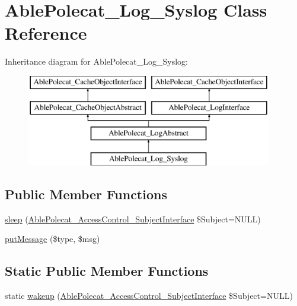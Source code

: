 \hypertarget{class_able_polecat___log___syslog}{}\section{Able\+Polecat\+\_\+\+Log\+\_\+\+Syslog Class Reference}
\label{class_able_polecat___log___syslog}
Inheritance diagram for Able\+Polecat\+\_\+\+Log\+\_\+\+Syslog\+:\begin{figure}[H]
\begin{center}
\leavevmode
\includegraphics[height=4.000000cm]{class_able_polecat___log___syslog}
\end{center}
\end{figure}
\subsection*{Public Member Functions}
\begin{DoxyCompactItemize}
\item 
\hyperlink{class_able_polecat___log___syslog_a365e24d7b066205cafa2a5cce3a4f224}{sleep} (\hyperlink{interface_able_polecat___access_control___subject_interface}{Able\+Polecat\+\_\+\+Access\+Control\+\_\+\+Subject\+Interface} \$Subject=N\+U\+L\+L)
\item 
\hyperlink{class_able_polecat___log___syslog_a952026c3d234eb84a9f211b17f33a110}{put\+Message} (\$type, \$msg)
\end{DoxyCompactItemize}
\subsection*{Static Public Member Functions}
\begin{DoxyCompactItemize}
\item 
static \hyperlink{class_able_polecat___log___syslog_a3f2135f6ad45f51d075657f6d20db2cd}{wakeup} (\hyperlink{interface_able_polecat___access_control___subject_interface}{Able\+Polecat\+\_\+\+Access\+Control\+\_\+\+Subject\+Interface} \$Subject=N\+U\+L\+L)
\end{DoxyCompactItemize}
